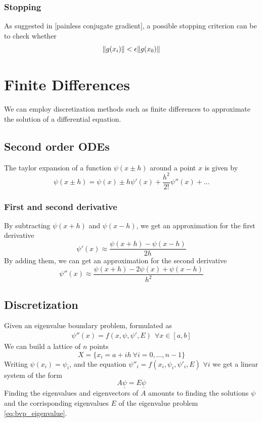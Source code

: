 \documentclass{article}
\begin{document}
\subsubsection{Stopping}
As suggested in [painless conjugate gradient], a possible stopping criterion can be to check whether 
\begin{equation}
    \norm{g(x_i)} < \epsilon \norm{g(x_0)}
\end{equation}

\section{Finite Differences}
We can employ discretization methods such as finite differences to approximate the solution of a differential equation.
\subsection{Second order ODEs}
The taylor expansion of a function $\psi(x\pm h)$ around a point $x$ is given by
\begin{equation}
    \psi(x\pm h) = \psi(x) \pm h \psi'(x) + \frac{h^2}{2!} \psi''(x) + \ldots
\end{equation}
\subsubsection{First and second derivative}
By subtracting $\psi(x+h)$ and $\psi(x-h)$, we get an approximation for the first derivative
\begin{equation}
    \label{eq:finite_diff_first_dv}
    \psi'(x) \approx \frac{\psi(x+h) - \psi(x-h)}{2h}
\end{equation}
By adding them, we can get an approximation for the second derivative
\begin{equation}
    \psi''(x) \approx \frac{\psi(x+h) - 2\psi(x) + \psi(x-h)}{h^2} \label{eq:finite_diff_2nd}
\end{equation}
\subsection{Discretization}
Given an eigenvalue boundary problem, formulated as
\begin{align}
    \psi''(x)  = f(x, \psi, \psi', E) \ \ \forall x \in [a, b] \label{eq:bvp_eigenvalue}
\end{align}
We can build a lattice of $n$ points
\begin{equation} 
    X = \{x_i = a + ih \ \forall i = 0, \ldots, n-1\}
\end{equation}
Writing $\psi(x_i) = \psi_i$, and the equation $\psi''_i = f(x_i, \psi_i, \psi'_i, E)$ $\forall i$ we get a linear system of the form
\begin{equation}
    A \underline{\psi} = E\underline{\psi}
\end{equation}
Finding the eigenvalues and eigenvectors of $A$ amounts to finding the solutions $\psi$ and the corrisponding eigenvalues $E$ of the eigenvalue problem \ref{eq:bvp_eigenvalue}.
\end{document}
